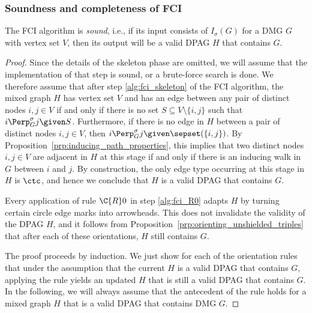 \subsubsection{Soundness and completeness of FCI}

\begin{Thm}\label{thm:fci_sound}
  The FCI algorithm is \emph{sound}, i.e., if its input consists of $I_\sigma(G)$ for a DMG $G$ with vertex set $V$, then its output will be a valid DPAG $H$ that contains $G$.
\end{Thm}
\begin{proof}
  Since the details of the skeleton phase are omitted, we will assume that the implementation of that step is sound, or a brute-force search is done.
  We therefore assume that after step \ref{alg:fci_skeleton} of the FCI algorithm, the mixed graph $H$ has vertex set $V$ and has an edge between any pair of distinct nodes $i,j \in V$ if and only if there is no set $S \subseteq V \setminus \{i,j\}$ such that $i \Perp^\sigma_G j \given S$.
  Furthermore, if there is no edge in $H$ between a pair of distinct nodes $i,j \in V$, then $i \Perp^\sigma_G j \given \sepset(\{i,j\})$.
  By Proposition~\ref{prp:inducing_path_properties}, this implies that two distinct nodes $i,j \in V$ are adjacent in $H$ at this stage if and only if there is an inducing walk in $G$ between $i$ and $j$.
  By construction, the only edge type occurring at this stage in $H$ is $\ctc$, and hence we conclude that $H$ is a valid DPAG that contains $G$. 

  Every application of rule $\C{R}0$ in step \ref{alg:fci_R0} adapts $H$ by turning certain circle edge marks into arrowheads.
  This does not invalidate the validity of the DPAG $H$, and it follows from Proposition~\ref{prp:orienting_unshielded_triples} that after each of these orientations, $H$ still contains $G$.

  The proof proceeds by induction.
  We just show for each of the orientation rules that under the assumption that the current $H$ is a valid DPAG that contains $G$, applying the rule yields an updated $H$ that is still a valid DPAG that contains $G$.
  In the following, we will always assume that the antecedent of the rule holds for a mixed graph $H$ that is a valid DPAG that contains DMG $G$.


\end{proof}
